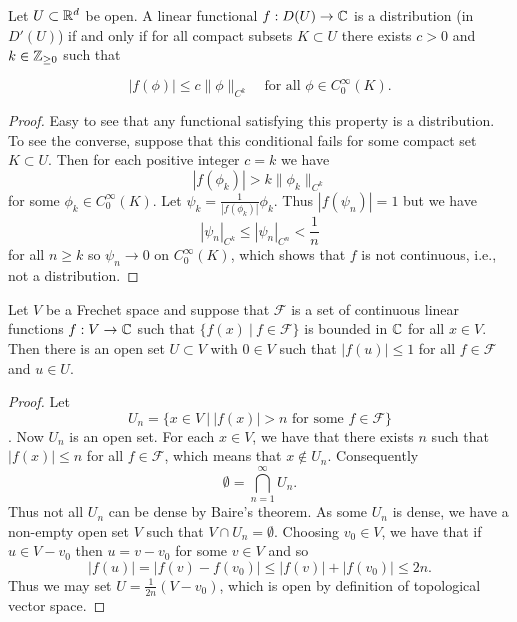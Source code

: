 \documentclass[twoside, a4paper, 10pt]{amsart}
\begin{document}
\begin{thm} \label{thm: distributions are lipschitz on compact sets} Let $U \subset \mathbb{R}^d$ be open. A linear functional $f:D(U) \to \mathbb{C}$ is a distribution (in $D'(U)$) if and only if for all compact subsets $K \subset U$ there exists $c>0$ and $k \in \mathbb{Z}_{\geq 0}$ such that

$$ |f(\phi)| \leq c \|\phi\|_{C^k} \quad \text{for all } \phi \in C_0^{\infty}(K).$$

\end{thm}

\begin{proof} Easy to see that any functional satisfying this property is a distribution. To see the converse, suppose that this conditional fails for some compact set $K \subset U$. Then for each positive integer $c = k$ we have $$|f(\phi_k)| > k \|\phi_k\|_{C^k}$$ for some $\phi_k \in C_0^{\infty}(K)$. Let $\psi_k = \frac{1}{|f(\phi_k)|} \phi_k$. Thus $|f(\psi_n)| = 1$ but we have $$|\psi_n|_{C^k} \leq |\psi_n|_{C^n} < \frac{1}{n}$$ for all $n \geq k$ so $\psi_n \to 0$ on $C_0^{\infty}(K)$, which shows that $f$ is not continuous, i.e., not a distribution. \end{proof}

\begin{thm} Let $V$ be a Frechet space and suppose that $\mathcal{F}$ is a set of continuous linear functions $f:V \to \mathbb{C}$ such that $\{ f(x) ~|~ f \in \mathcal{F} \}$ is bounded in $\mathbb{C}$ for all $x \in V$. Then there is an open set $U \subset V$ with $0 \in V$ such that $|f(u)| \leq 1$ for all $f \in \mathcal{F}$ and $u \in U$. \end{thm}


\begin{proof} Let $$U_n = \{ x \in V ~|~ |f(x)| > n \text{ for some } f \in \mathcal{F} \}$$. Now $U_n$ is an open set. For each $x \in V$, we have that there exists $n$ such that $|f(x)| \leq n$ for all $f \in \mathcal{F}$, which means that $x \notin U_n$. Consequently $$\emptyset = \bigcap_{n=1}^{\infty} U_n.$$ Thus not all $U_n$ can be dense by Baire's theorem. As some $U_n$ is dense, we have a non-empty open set $V$ such that $V \cap U_n = \emptyset$. Choosing $v_0 \in V$, we have that if $u \in V-v_0$ then $u = v-v_0$ for some $v \in V$ and so $$|f(u)| = |f(v) - f(v_0)| \leq |f(v)| + |f(v_0)| \leq 2n.$$ Thus we may set $U = \frac{1}{2n}(V-v_0)$, which is open by definition of topological vector space. \end{proof}
\end{document}
